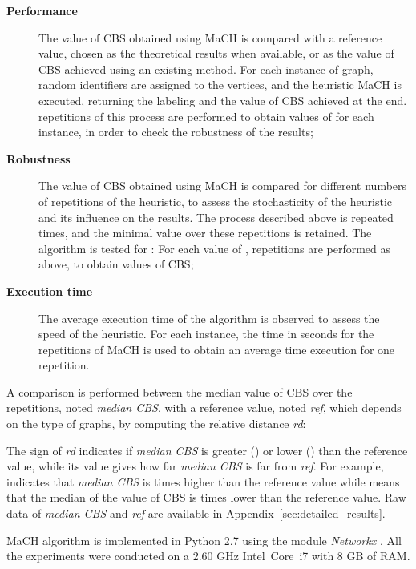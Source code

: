 \documentclass{scrartcl}
\theoremstyle{plain}
\newcommand{\algo}{MaCH}
\newcommand{\cbs}{CBS}
\begin{document}
\begin{description}
	\item[\textbf{Performance}] The value of \cbs{} obtained using \algo{} is 
compared with a reference value, chosen as the theoretical results when 
available, or as the value of \cbs{} achieved using an existing method. For 
each 
instance of graph, random identifiers are assigned to the vertices, and the 
heuristic \algo{} is executed, returning the labeling and the value of \cbs{} 
achieved at the end.  repetitions of this process are performed to obtain 
 values of  for each instance, in order to check the robustness of 
the results;
	\item[\textbf{Robustness}] The value of \cbs{} obtained using \algo{} is 
compared for different numbers of repetitions of the heuristic, to assess the 
stochasticity of the heuristic and its influence on the results. The process 
described above is repeated  times, and the minimal value over these  
repetitions is retained. The algorithm is tested for :  For each value of ,  repetitions are performed 
as above, to obtain  values of \cbs{};
	\item[\textbf{Execution time}] The average execution time of the algorithm 
is observed to assess the speed of the heuristic. For each instance, the time 
in seconds for the  repetitions of \algo{} is used to obtain an 
average time execution for one repetition.
\end{description}

A comparison is performed between the median value of \cbs{} over the  
repetitions, noted \emph{median \cbs{}}, with a reference value, noted 
\emph{ref}, which depends on the type of graphs, by computing the relative 
distance \emph{rd}:

 

The sign of \emph{rd} indicates if \emph{median \cbs{}} is greater () or lower () than the reference value, while its value gives 
how far \emph{median \cbs{}} is far from \emph{ref}. For example,  
indicates that \emph{median \cbs{}} is  times higher than the reference 
value while  means that the median of the value of \cbs{} is  
times lower than the reference value. Raw data of \emph{median \cbs{}} and 
\emph{ref} are available in Appendix~\ref{sec:detailed_results}.

\algo{} algorithm is implemented in Python 2.7 using the module \emph{Networkx} 
\cite{Hagberg2008}. All the experiments were conducted on a 2.60 GHz 
Intel~Core~i7  with 8 GB of RAM.
\end{document}
